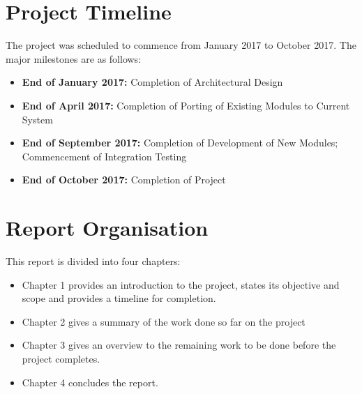 \section{Project Timeline}

The project was scheduled to commence from January 2017 to October 2017. The major
milestones are as follows:

\begin{itemize}
    \item \textbf{End of January 2017:} Completion of Architectural Design
    \item \textbf{End of April 2017:} Completion of Porting of Existing Modules
    to Current System
    \item \textbf{End of September 2017:} Completion of Development of New Modules;
    Commencement of Integration Testing
    \item \textbf{End of October 2017:} Completion of Project
\end{itemize}

\section{Report Organisation}

This report is divided into four chapters:

\begin{itemize}
    \item Chapter 1 provides an introduction to the project, states its objective
    and scope and provides a timeline for completion.
    \item Chapter 2 gives a summary of the work done so far on the project
    \item Chapter 3 gives an overview to the remaining work to be done before the
    project completes.
    \item Chapter 4 concludes the report.
\end{itemize}